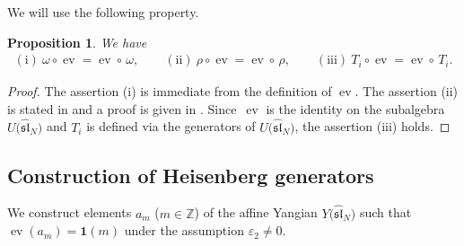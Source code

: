 \documentclass[11pt]{article}
\newtheorem{prop}[thm]{Proposition}
\theoremstyle{definition}
\numberwithin{equation}{section}
\DeclareMathOperator{\ev}{ev}
\newcommand{\ve}{\varepsilon}
\newcommand{\bbZ}{\mathbb{Z}}
\newcommand{\affY}{Y\big(\affsl\big)}
\newcommand{\affsl}{\hat{\mathfrak{sl}}_N}
\newcommand{\bfid}{\mathbf{1}}
\begin{document}
We will use the following property.
\begin{prop}\label{prop:ev_and_auto}We have
\begin{gather*}
\mathrm{(i)}\ \omega \circ \ev = \ev \circ \,\omega, \qquad \mathrm{(ii)}\ \rho \circ \ev = \ev \circ\, \rho,\qquad \mathrm{(iii)}\ T_i \circ \ev = \ev \circ\, T_i.
\end{gather*}
\end{prop}
\begin{proof}The assertion (i) is immediate from the definition of $\ev$. The assertion (ii) is stated in \cite[Section~6, p.~463]{MR2323534} and a proof is given in \cite[Proposition~3.6]{kodera_evaluation}. Since~$\ev$ is the identity on the subalgebra $U\big(\affsl\big)$ and $T_i$ is defined via the generators of $U\big(\affsl\big)$, the assertion (iii) holds.
\end{proof}

\subsection{Construction of Heisenberg generators}

We construct elements $a_m$ ($m \in \bbZ$) of the affine Yangian $\affY$ such that $\ev(a_m) = \bfid(m)$ under the assumption $\ve_2 \neq 0$.
\end{document}
